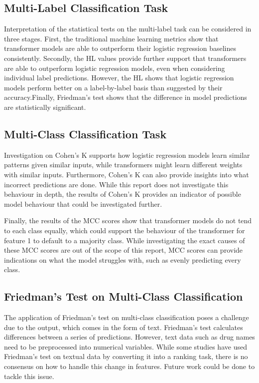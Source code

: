 \documentclass[10.7pt, onecolumn]{article}
\begin{document}
\subsection{Multi-Label Classification Task}
Interpretation of the statistical tests on the multi-label task can be considered in three stages. First, the traditional machine learning metrics show that transformer models are able to outperform their logistic regression baselines consistently. Secondly, the HL values provide further support that transformers are able to outperform logistic regression models, even when considering individual label predictions. However, the HL shows that logistic regression models perform better on a label-by-label basis than suggested by their accuracy.Finally, Friedman's test shows that the difference in model predictions are statistically significant.


\subsection{Multi-Class Classification Task}

Investigation on Cohen's K supports how logistic regression models learn similar patterns given similar inputs, while transformers might learn different weights with similar inputs. Furthermore, Cohen's K can also provide insights into what incorrect predictions are done. While this report does not investigate this behaviour in depth, the results of Cohen's K provides an indicator of possible model behaviour that could be investigated further.

Finally, the results of the MCC scores show that transformer models do not tend to each class equally, which could support the behaviour of the transformer for feature 1 to default to a majority class. While investigating the exact causes of these MCC scores are out of the scope of this report, MCC scores can provide indications on what the model struggles with, such as evenly predicting every class.

\subsection{Friedman's Test on Multi-Class Classification}

The application of Friedman's test on multi-class classification poses a challenge due to the output, which comes in the form of text. Friedman's test calculates differences between a series of predictions. However, text data such as drug names need to be preprocessed into numerical variables. While some studies have used Friedman's test on textual data by converting it into a ranking task\cite{article1}, there is no consensus on how to handle this change in features. Future work could be done to tackle this issue.
\end{document}

